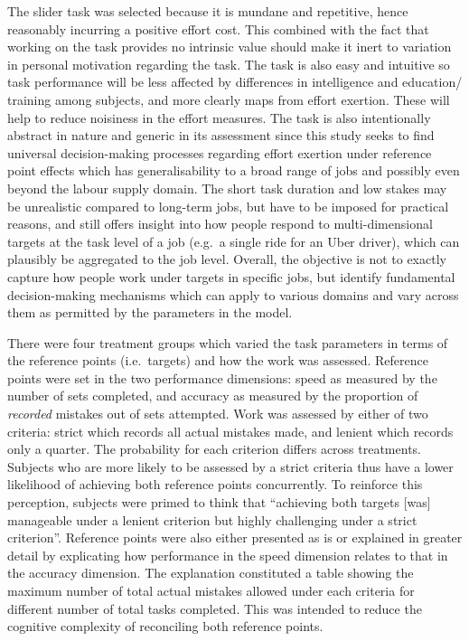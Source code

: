 \documentclass[
  12,
  letterpaper,
  DIV=11,
  numbers=noendperiod]{scrartcl}
\begin{document}
The slider task was selected because it is mundane and repetitive, hence
reasonably incurring a positive effort cost. This combined with the fact
that working on the task provides no intrinsic value should make it
inert to variation in personal motivation regarding the task. The task
is also easy and intuitive so task performance will be less affected by
differences in intelligence and education/ training among subjects, and
more clearly maps from effort exertion. These will help to reduce
noisiness in the effort measures. The task is also intentionally
abstract in nature and generic in its assessment since this study seeks
to find universal decision-making processes regarding effort exertion
under reference point effects which has generalisability to a broad
range of jobs and possibly even beyond the labour supply domain. The
short task duration and low stakes may be unrealistic compared to
long-term jobs, but have to be imposed for practical reasons, and still
offers insight into how people respond to multi-dimensional targets at
the task level of a job (e.g.~a single ride for an Uber driver), which
can plausibly be aggregated to the job level. Overall, the objective is
not to exactly capture how people work under targets in specific jobs,
but identify fundamental decision-making mechanisms which can apply to
various domains and vary across them as permitted by the parameters in
the model.

There were four treatment groups which varied the task parameters in
terms of the reference points (i.e.~targets) and how the work was
assessed. Reference points were set in the two performance dimensions:
speed as measured by the number of sets completed, and accuracy as
measured by the proportion of \emph{recorded} mistakes out of sets
attempted. Work was assessed by either of two criteria: strict which
records all actual mistakes made, and lenient which records only a
quarter. The probability for each criterion differs across treatments.
Subjects who are more likely to be assessed by a strict criteria thus
have a lower likelihood of achieving both reference points concurrently.
To reinforce this perception, subjects were primed to think that
``achieving both targets {[}was{]} manageable under a lenient criterion
but highly challenging under a strict criterion''. Reference points were
also either presented as is or explained in greater detail by
explicating how performance in the speed dimension relates to that in
the accuracy dimension. The explanation constituted a table showing the
maximum number of total actual mistakes allowed under each criteria for
different number of total tasks completed. This was intended to reduce
the cognitive complexity of reconciling both reference points.
\end{document}
